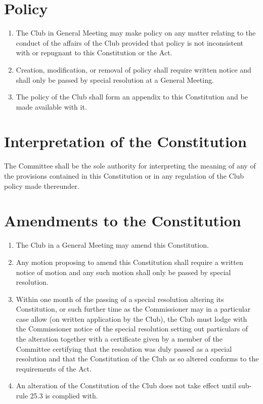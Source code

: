 \documentclass[11pt]{article} %
\begin{document}
\section{Policy}
\begin{enumerate}
	\item The Club in General Meeting may make policy on any matter relating to the conduct of the affairs of the Club provided that policy is not inconsistent with or repugnant to this Constitution or the Act.
	\item Creation, modification, or removal of policy shall require written notice and shall only be passed by special resolution at a General Meeting.
	\item The policy of the Club shall form an appendix to this Constitution and be made available with it.
\end{enumerate}

\section{Interpretation of the Constitution}
The Committee shall be the sole authority for interpreting the meaning of any of the provisions contained in this Constitution or in any regulation of the Club policy made thereunder.

\section{Amendments to the Constitution}
\begin{enumerate}
	\item The Club in a General Meeting may amend this Constitution.
	\item Any motion proposing to amend this Constitution shall require a written notice of motion and any such motion shall only be passed by special resolution.
	\item Within one month of the passing of a special resolution altering its Constitution, or such further time as the Commissioner may in a particular case allow (on written application by the Club), the Club must lodge with the Commissioner notice of the special resolution setting out particulars of the alteration together with a certificate given by a member of the Committee certifying that the resolution was duly passed as a special resolution and that the Constitution of the Club as so altered conforms to the requirements of the Act.
	\item An alteration of the Constitution of the Club does not take effect until sub-rule 25.3 is complied with.
\end{enumerate}
\end{document}

